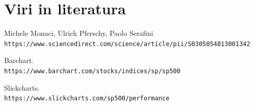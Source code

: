 \documentclass[a4paper,12pt]{article}
\theoremstyle{definition}
\begin{document}
\newpage
\section{Viri in literatura}

\begin{thebibliography}{9}

    Michele Monaci, Ulrich Pferschy, Paolo Serafini 
    \\\texttt{https://www.sciencedirect.com/science/article/pii/S0305054813001342}

     Barchart. 
     \\\texttt{https://www.barchart.com/stocks/indices/sp/sp500}

     Slickcharts.
     \\\texttt{https://www.slickcharts.com/sp500/performance}
\end{thebibliography}
\end{document}
